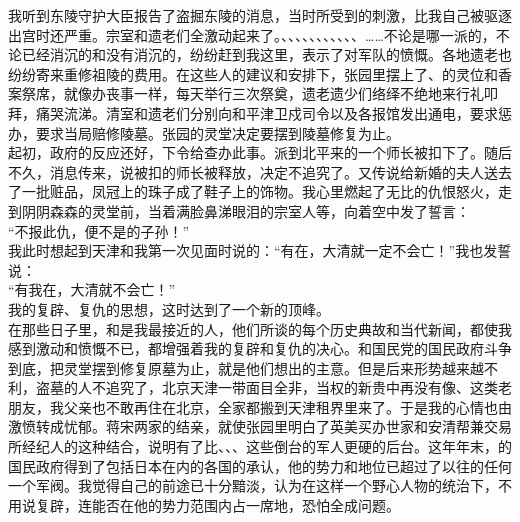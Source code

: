 我听到东陵守护大臣报告了盗掘东陵的消息，当时所受到的刺激，比我自己被驱逐出宫时还严重。宗室和遗老们全激动起来了。、、、、、、、、、、、……不论是哪一派的，不论已经消沉的和没有消沉的，纷纷赶到我这里，表示了对军队的愤慨。各地遗老也纷纷寄来重修祖陵的费用。在这些人的建议和安排下，张园里摆上了、的灵位和香案祭席，就像办丧事一样，每天举行三次祭奠，遗老遗少们络绎不绝地来行礼叩拜，痛哭流涕。清室和遗老们分别向和平津卫戍司令以及各报馆发出通电，要求惩办，要求当局赔修陵墓。张园的灵堂决定要摆到陵墓修复为止。\\

起初，政府的反应还好，下令给查办此事。派到北平来的一个师长被扣下了。随后不久，消息传来，说被扣的师长被释放，决定不追究了。又传说给新婚的夫人送去了一批赃品，凤冠上的珠子成了鞋子上的饰物。我心里燃起了无比的仇恨怒火，走到阴阴森森的灵堂前，当着满脸鼻涕眼泪的宗室人等，向着空中发了誓言：\\

“不报此仇，便不是的子孙！”\\

我此时想起到天津和我第一次见面时说的：“有在，大清就一定不会亡！”我也发誓说：\\

“有我在，大清就不会亡！”\\

我的复辟、复仇的思想，这时达到了一个新的顶峰。\\

在那些日子里，和是我最接近的人，他们所谈的每个历史典故和当代新闻，都使我感到激动和愤慨不已，都增强着我的复辟和复仇的决心。和国民党的国民政府斗争到底，把灵堂摆到修复原墓为止，就是他们想出的主意。但是后来形势越来越不利，盗墓的人不追究了，北京天津一带面目全非，当权的新贵中再没有像、这类老朋友，我父亲也不敢再住在北京，全家都搬到天津租界里来了。于是我的心情也由激愤转成忧郁。蒋宋两家的结亲，就使张园里明白了英美买办世家和安清帮兼交易所经纪人的这种结合，说明有了比、、、这些倒台的军人更硬的后台。这年年末，的国民政府得到了包括日本在内的各国的承认，他的势力和地位已超过了以往的任何一个军阀。我觉得自己的前途已十分黯淡，认为在这样一个野心人物的统治下，不用说复辟，连能否在他的势力范围内占一席地，恐怕全成问题。\\

